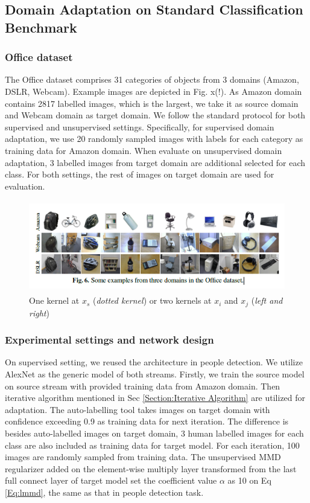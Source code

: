 \documentclass[runningheads]{llncs}
\begin{document}
\subsection{Domain Adaptation on Standard Classification Benchmark}

\subsubsection{Office dataset}
The Office dataset \cite{saenko2010adapting} comprises 31 categories of objects from 3 domains (Amazon, DSLR, Webcam). Example images are depicted in Fig. x(!). As Amazon domain contains 2817 labelled images, which is the largest, we take it as source domain and Webcam domain as target domain. We follow the standard protocol for both supervised and unsupervised settings. Specifically, for supervised domain adaptation, we use 20 randomly sampled images with labels for each category as training data for Amazon domain. When evaluate on unsupervised domain adaptation, 3 labelled images from target domain are additional selected for each class. For both settings, the rest of images on target domain are used for evaluation.

\begin{figure}
\centering
\includegraphics[height=4cm]{images/officeimages.png}
\caption{One kernel at $x_s$ ({\it dotted kernel}) or two kernels at
$x_i$ and $x_j$ ({\it left and right}) }
\label{fig:example}
\end{figure}

\subsubsection{Experimental settings and network design}
On supervised setting, we reused the architecture in people detection. We utilize AlexNet \cite{krizhevsky2012imagenet} as the generic model of both streams. Firstly, we train the source model on source stream with provided training data from Amazon domain. Then iterative algorithm mentioned in Sec \ref{Section:Iterative Algorithm} are utilized for adaptation. The auto-labelling tool takes images on target domain with confidence exceeding 0.9 as training data for next iteration. The difference is besides auto-labelled images on target domain, 3 human labelled images for each class are also included as training data for target model. For each iteration, 100 images are randomly sampled from training data. The unsupervised MMD regularizer added on the element-wise multiply layer transformed from the last full connect layer of target model set the coefficient value $\alpha$ as 10 on Eq \ref{Eq:lmmd}, the same as that in people detection task.
\end{document}
